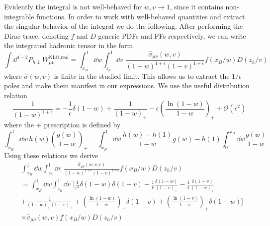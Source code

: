 Evidently the integral is not well-behaved for $w,v\to 1$, since it contains non-integrable functions. In order to work with well-behaved quantities and extract the singular behavior of the integral we do the following. After performing the Dirac trace, denoting $f$ and $D$ generic PDFs and FFs respectively, we can write the integrated hadronic tensor in the form
\begin{equation}
    \int \dd^{d-2}P_{h\perp} W_{\mu\nu}^{\text{NLO,real}}= \int_{x_B}^{1} \dd w\int_{z_h}^{1} \dd v \,\,\frac{\hat \sigma_{\mu\nu}(w,v)}{(1-w)^{1+\epsilon}(1-v)^{1+\epsilon}}f(x_B/w)D(z_h/v)
\end{equation}
where $\hat \sigma(w,v)$ is finite in the studied limit. This allows us to extract the $1/\epsilon$ poles and make them manifest in our expressions. We use the useful distribution relation \cite{Schwartz:2014sze}
\begin{equation}
    \frac{1}{(1-w)^{1+\epsilon}}=-\frac{1}{\epsilon}\delta(1-w) + \frac{1}{(1-w)_+}-\epsilon\left(\frac{\ln(1-w)}{1-w}\right)_+ + \mathcal{O}(\epsilon^2)
\end{equation}
where the + prescription is defined by \cite{handbookqcdsterman95}
\begin{equation}
    \int_{x_B}^1 \dd w \,h(w)\left(\frac{g(w)}{1-w}\right)_+=\int _{x_B}^1\dd w \,\frac{h(w)-h(1)}{1-w}g(w) - h(1)\int_0^{x_B}\dd w \frac{g(w)}{1-w}
\end{equation}
Using these relations we derive
\begin{equation}
    \begin{aligned}
        &\int_{x_B}^{1} \dd w\int_{z_h}^{1} \dd v \,\,\frac{\hat \sigma_{\mu\nu}(w,v,\epsilon)}{(1-w)^{1+\epsilon}(1-v)^{1+\epsilon}}f(x_B/w)D(z_h/v)\\&=\int_{x_B}^{1} \dd w\int_{z_h}^{1} \dd v \,\,\Bigg[\frac{1}{\epsilon^2}\delta(1-w)\delta(1-v)-\frac{1}{\epsilon}\frac{\delta(1-w)}{(1-v)_+}-\frac{1}{\epsilon}\frac{\delta(1-v)}{(1-w)_+}\\
        &+\frac{1}{(1-w)_+(1-v)_+}+\left(\frac{\ln(1-w)}{1-w}\right)_+\delta(1-v)+\left(\frac{\ln(1-v)}{1-v}\right)_+\delta(1-w)\Bigg]\\&\times\hat\sigma_{\mu\nu}(w,v)f(x_B/w)D(z_h/v)
    \end{aligned}
\end{equation}
